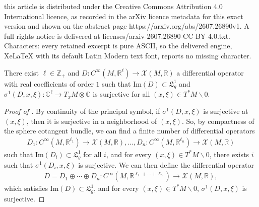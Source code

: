 \documentclass[10pt,a4paper]{amsart}
\newcommand{\Chi}{{\mathcal X}}
\newcommand{\C}{{\mathbb C}}
\newcommand{\LL}{{\mathfrak L}}
\newcommand{\R}{{\mathbb R}}
\newcommand{\Z}{{\mathbb Z}}
\begin{document}
this article is distributed under the Creative Commons Attribution 4.0 International licence, as recorded in the arXiv licence metadata for this exact version and shown on the abstract page https://arxiv.org/abs/2607.26890v1. A full rights notice is delivered at licenses/arxiv-2607.26890-CC-BY-4.0.txt. Characters: every retained excerpt is pure ASCII, so the delivered engine, XeLaTeX with its default Latin Modern text font, reports no missing character.
\begin{theorem}\label{theorem : elliptic construction}
    There exist $\ell \in \Z_+$ and $D: C^\infty(M,\R^\ell)\rightarrow \Chi(M,\R)$ a differential operator with real coefficients of order $1$ such that $\mathrm{Im}(D)\subset \LL_g^1$ and $\sigma^1(D,x,\xi):\C^\ell\to T_xM\otimes \C$ is surjective for all $(x,\xi)\in T^*M\backslash 0$.
\end{theorem}

\begin{proof}[Proof of ]
    By continuity of the principal symbol, if $\sigma^1(D,x,\xi)$ is surjective at $(x,\xi)$, then it is surjective in a neighborhood of $(x,\xi)$.
    So, by compactness of the sphere cotangent bundle, we can find a finite number of differential operators
    \begin{equation*}\begin{aligned}
            D_{1}: C^\infty(M,\R^{\ell_1})\rightarrow \Chi(M,\R),\dots, D_{n}: C^\infty(M,\R^{\ell_n})\rightarrow \Chi(M,\R)
        \end{aligned}\end{equation*}
    such that $\mathrm{Im}(D_{i})\subset \LL_g^1$ for all $i$, and for every $(x,\xi)\in T^*M\backslash 0$, there exists $i$ such that $\sigma^1(D_{i},x,\xi)$ is surjective.
    We can then define
    the differential operator
    \begin{equation*}\begin{aligned}
            D=D_1\oplus \cdots\oplus D_n:C^\infty(M,\R^{\ell_1+\cdots+\ell_n})\rightarrow \Chi(M,\R),
        \end{aligned}\end{equation*}
    which satisfies
    $\mathrm{Im}(D)\subset \LL_g^1$, and for every $(x,\xi)\in T^*M\backslash 0$, $\sigma^1(D,x,\xi)$ is surjective.
\end{proof}
\end{document}

